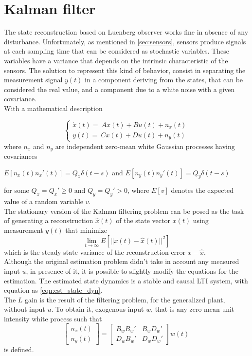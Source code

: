 \section{Kalman filter}

The state reconstruction based on Luenberg observer works fine in absence of any disturbance. Unfortunately, as mentioned in \cref{sec:sensors}, sensors produce signals at each sampling time that can be considered as stochastic variables. These variables have a variance that depends on the intrinsic characteristic of the sensors. The solution to represent this kind of behavior, consist in separating the measurement signal $y(t)$ in a component deriving from the states, that can be considered the real value, and a component due to a white noise with a given covariance.  \\

With a mathematical description 

\begin{equation}
	\begin{cases}
		\dot x(t) =\ A x(t) + B u(t) +n_x(t) \\
		y(t) =\ C x(t) + D u(t) + n_y(t)
	\end{cases}
\end{equation}
where $n_x$ and $n_y$ are independent zero-mean white Gaussian processes having covariances
\begin{center}
	$E[n_x(t)n_x'(t)]=Q_x \delta(t-s)$  and $E[n_y(t)n_y'(t)]=Q_y \delta(t-s) $
\end{center}
for some $Q_x = Q_x' \geq 0$ and $Q_y = Q_y' > 0$, where $E[v]$ denotes the expected value of a random variable $v$.\\

The stationary version of the Kalman filtering problem can be posed as the task of generating a reconstruction $\hat x (t)$ of the state vector $x(t)$ using measurement $y(t)$ that minimize 
\begin{equation}
	\lim_{t \to \infty }E[ ||x(t) - \hat x(t) ||^2 ]
\end{equation}
which is the steady state variance of the reconstruction error $ x-\hat x$.\\

Although the original estimation problem didn't take in account any measured input $u$, in presence of it, it is possible to slightly modify the equations for the estimation. 
The estimated state dynamics is a stable and causal LTI system, with equation as \cref{eqn:est_state_dyn}. \\
The $L$ gain is the result of the filtering problem, for the generalized plant, without input $u$.
To obtain it, exogenous input $w$, that is any zero-mean unit-intensity white process such that
\begin{equation}
	\begin{bmatrix}
		n_x(t) \\
		n_y(t)
	\end{bmatrix} = 
	\begin{bmatrix}
		B_wB_w'& B_wD_w'\\
		D_wB_w' & D_wD_w'
	\end{bmatrix} w(t)
\end{equation}
is defined. \\

